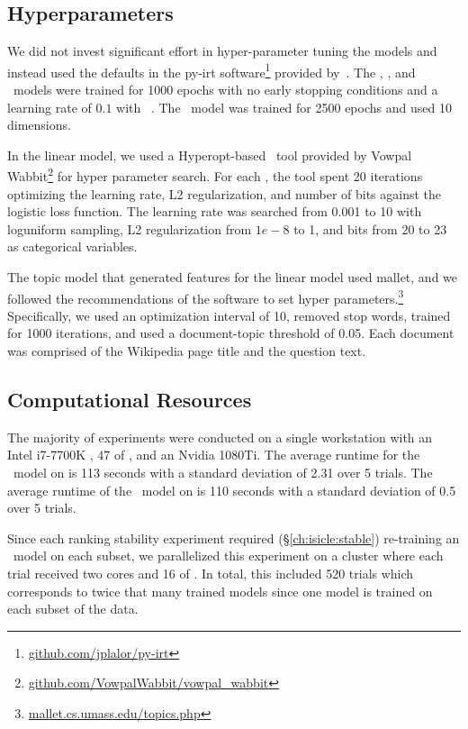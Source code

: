 \subsection{Hyperparameters}

We did not invest significant effort in hyper-parameter tuning the \irt{} models and instead used the defaults in the py-irt software\footnote{\href{https://github.com/jplalor/py-irt}{github.com/jplalor/py-irt}} provided by~\citet{lalor2019latent}.
The , , and ~models were trained for 1000 epochs with no early stopping conditions and a learning rate of $0.1$ with ~\citep{Kingma2014AdamAM}.
The ~model was trained for 2500 epochs and used 10 dimensions.

In the linear model, we used a Hyperopt-based~\citep{bergstra2013hyperopt} tool provided by Vowpal Wabbit\footnote{
  \href{https://github.com/VowpalWabbit/vowpal_wabbit}{github.com/VowpalWabbit/vowpal\_wabbit}
} for hyper parameter search.
For each , the tool spent 20 iterations optimizing the learning rate, L2 regularization, and number of bits against the logistic loss function.
The learning rate was searched from 0.001 to 10 with loguniform sampling, L2 regularization from $1e-8$ to 1, and bits from 20 to 23 as categorical variables.

The topic model that generated features for the linear model used mallet, and we followed the recommendations of the software to set hyper parameters.\footnote{
  \href{http://mallet.cs.umass.edu/topics.php}{mallet.cs.umass.edu/topics.php}
}
Specifically, we used an optimization interval of 10, removed stop words, trained for 1000 iterations, and used a document-topic threshold of 0.05.
Each document was comprised of the Wikipedia page title and the question text.

\subsection{Computational Resources}

The majority of experiments were conducted on a single workstation with an Intel i7-7700K , $47$ of , and an Nvidia 1080Ti.
The average runtime for the ~model on  is 113 seconds with a standard deviation of 2.31 over 5 trials.
The average runtime of the ~model on  is 110 seconds with a standard deviation of 0.5 over 5 trials.

Since each ranking stability experiment required (\S\ref{ch:isicle:stable}) re-training an ~model on each subset, we parallelized this experiment on a  cluster where each trial received two  cores and 16 of .
In total, this included 520 trials which corresponds to twice that many trained \irt{} models since one model is trained on each subset of the data.
